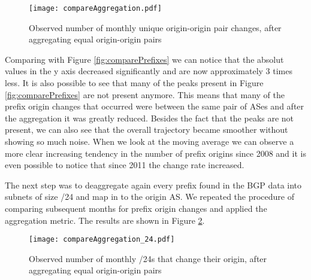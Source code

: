 \documentclass[11pt,a4paper]{scrreprt}
\begin{document}
\begin{figure}[!h]
\centering
\texttt{[image: compareAggregation.pdf]}
\caption{Observed number of monthly
unique origin-origin pair changes, after aggregating equal origin-origin pairs}
\label{fig:compareAggregation}
\end{figure}


Comparing with Figure \ref{fig:comparePrefixes} we can notice that the absolut values in the y axis decreased significantly and are now approximately 3 times less. It is also possible to see that many of the peaks present in Figure \ref{fig:comparePrefixes} are not present anymore. This means that many of the prefix origin changes that occurred were between the same pair of ASes and after the aggregation it was greatly reduced. Besides the fact that the peaks are not present, we can also see that the overall trajectory became smoother without showing so much noise. When we look at the moving average we can observe a more clear increasing tendency in the number of prefix origins since 2008 and it is even possible to notice that since 2011 the change rate increased. 

The next step was to deaggregate again every prefix found in the BGP data into subnets of size /24 and map in to the origin AS. We repeated the procedure of comparing subsequent months for prefix origin changes and applied the aggregation metric. The results are shown in Figure \ref{fig:compareAggregation24}.

\begin{figure}[!h]
\centering
\texttt{[image: compareAggregation\_24.pdf]}
\caption{Observed number of monthly
/24s that change their origin, after aggregating equal origin-origin pairs}
\label{fig:compareAggregation24}
\end{figure}
\end{document}
